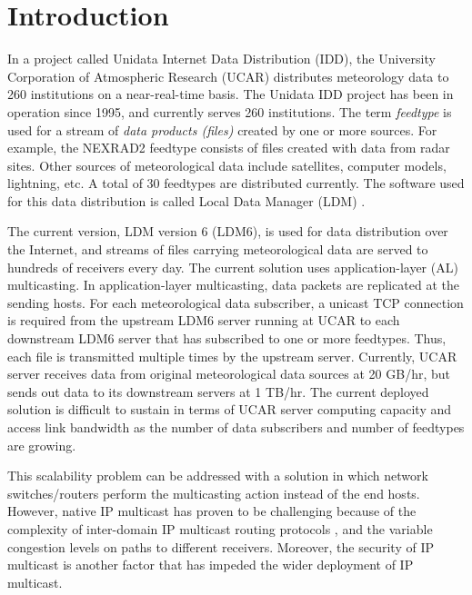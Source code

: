 \chapter{Introduction}
\label{sec:intro}

In a project called Unidata Internet Data Distribution (IDD),
the University Corporation of Atmospheric Research (UCAR)
distributes meteorology data to 260 institutions on a near-real-time basis\cite{IDD}.
The Unidata IDD project has been in operation since 1995, and currently serves 260 institutions.
The term \emph{feedtype} is used for
a stream of \emph{data products (files)} created by one or more
sources. 
For example, the NEXRAD2 feedtype consists of files created with
data from radar sites. Other sources of meteorological data include
satellites, computer models, lightning, etc. A total of 30 feedtypes are distributed currently.
The software used for this data distribution is called Local Data Manager (LDM) \cite{IDD}.

The current version, LDM version 6 (LDM6), is used for data distribution over the Internet, and streams of files carrying meteorological data are served to hundreds of receivers every day. The current solution uses application-layer (AL) multicasting. In application-layer multicasting, data packets are
replicated at the sending hosts. For each meteorological data subscriber, a unicast TCP connection
is required from the upstream LDM6 server running at UCAR to each downstream LDM6 server that has
subscribed to one or more feedtypes. Thus, each file is transmitted multiple times by the upstream server. Currently, UCAR server receives data from original meteorological data sources at 20 GB/hr, but sends out data to its downstream servers at 1 TB/hr. The current deployed solution is difficult to sustain in terms of UCAR server computing capacity and access link bandwidth as the number of data subscribers and number of feedtypes are growing.

This scalability problem can be addressed with a solution in which network switches/routers perform the multicasting action instead of the end hosts. However, native IP multicast has proven to be challenging \cite{Ratnasamy:2006:RIM:1159913.1159917} because of the complexity of inter-domain IP multicast routing protocols \cite{rfc3618}, and the variable congestion levels on paths to different receivers. Moreover, the security of IP multicast \cite{hardjono2000ip} is another factor that has impeded the wider deployment of IP multicast.

